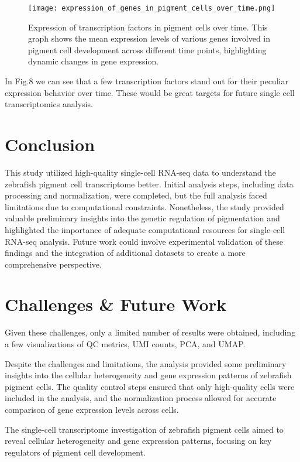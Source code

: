 \documentclass[runningheads]{llncs}
\begin{document}
\begin{figure}[H]
  \centering
  \texttt{[image: expression\_of\_genes\_in\_pigment\_cells\_over\_time.png]}
  \caption{Expression of transcription factors in pigment cells over time. This graph shows the mean expression levels of various genes involved in pigment cell development across different time points, highlighting dynamic changes in gene expression.}
  \label{results 3}
\end{figure}

In Fig.8 we can see that a few transcription factors stand out for their peculiar expression behavior over time. These would be great targets for future single cell transcriptomics analysis.

\section{Conclusion}

This study utilized high-quality single-cell RNA-seq data to understand the zebrafish pigment cell transcriptome better. Initial analysis steps, including data processing and normalization, were completed, but the full analysis faced limitations due to computational constraints. Nonetheless, the study provided valuable preliminary insights into the genetic regulation of pigmentation and highlighted the importance of adequate computational resources for single-cell RNA-seq analysis. Future work could involve experimental validation of these findings and the integration of additional datasets to create a more comprehensive perspective.

\section{Challenges \& Future Work}

Given these challenges, only a limited number of results were obtained, including a few visualizations of QC metrics, UMI counts, PCA, and UMAP.

Despite the challenges and limitations, the analysis provided some preliminary insights into the cellular heterogeneity and gene expression patterns of zebrafish pigment cells. The quality control steps ensured that only high-quality cells were included in the analysis, and the normalization process allowed for accurate comparison of gene expression levels across cells. 

The single-cell transcriptome investigation of zebrafish pigment cells aimed to reveal cellular heterogeneity and gene expression patterns, focusing on key regulators of pigment cell development. 
\end{document}
